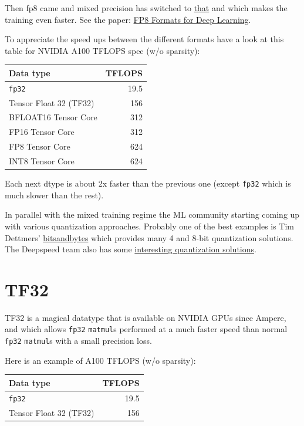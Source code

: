 \documentclass[
]{report}
\begin{document}
Then fp8 came and mixed precision has switched to
\href{https://docs.nvidia.com/deeplearning/transformer-engine/user-guide/examples/fp8_primer.html}{that}
and which makes the training even faster. See the paper:
\href{https://arxiv.org/abs/2209.05433}{FP8 Formats for Deep Learning}.

To appreciate the speed ups between the different formats have a look at
this table for NVIDIA A100 TFLOPS spec (w/o sparsity):

\begin{longtable}[]{@{}lr@{}}
\toprule\noalign{}
Data type & TFLOPS \\
\midrule\noalign{}
\endhead
\bottomrule\noalign{}
\endlastfoot
\texttt{fp32} & 19.5 \\
Tensor Float 32 (TF32) & 156 \\
BFLOAT16 Tensor Core & 312 \\
FP16 Tensor Core & 312 \\
FP8 Tensor Core & 624 \\
INT8 Tensor Core & 624 \\
\end{longtable}

Each next dtype is about 2x faster than the previous one (except
\texttt{fp32} which is much slower than the rest).

In parallel with the mixed training regime the ML community starting
coming up with various quantization approaches. Probably one of the best
examples is Tim Dettmers'
\href{https://github.com/TimDettmers/bitsandbytes}{bitsandbytes} which
provides many 4 and 8-bit quantization solutions. The Deepspeed team
also has some
\href{https://www.deepspeed.ai/tutorials/model-compression/}{interesting
quantization solutions}.

\section{TF32}\label{tf32}

TF32 is a magical datatype that is available on NVIDIA GPUs since
Ampere, and which allows \texttt{fp32} \texttt{matmul}s performed at a
much faster speed than normal \texttt{fp32} \texttt{matmul}s with a
small precision loss.

Here is an example of A100 TFLOPS (w/o sparsity):

\begin{longtable}[]{@{}lr@{}}
\toprule\noalign{}
Data type & TFLOPS \\
\midrule\noalign{}
\endhead
\bottomrule\noalign{}
\endlastfoot
\texttt{fp32} & 19.5 \\
Tensor Float 32 (TF32) & 156 \\
\end{longtable}
\end{document}
